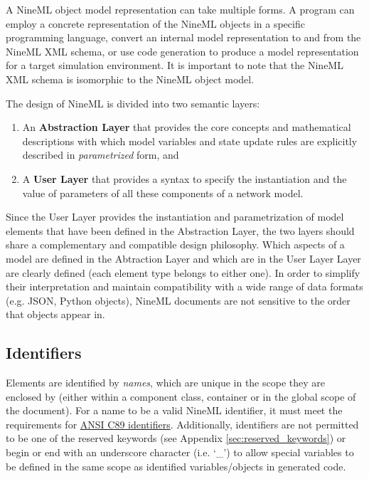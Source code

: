 \documentclass[draftspec]{ninemlspec}
\begin{document}
A NineML object model representation can take multiple forms.  A
program can employ a concrete representation of the NineML objects in
a specific programming language, convert an internal model
representation to and from the NineML XML schema, or use code generation 
to produce a model representation for a target simulation environment. 
It is important to note that the NineML XML schema is isomorphic to the NineML
object model.

The design of NineML is divided into two semantic layers:
\begin {enumerate}
\item An {\bf Abstraction Layer} that provides the core concepts and
mathematical descriptions with which model variables and state update
rules are explicitly described in {\em parametrized} form, and
\item A {\bf User Layer} that provides a syntax to specify the
instantiation and the value of parameters of all these components of a network
model.
\end {enumerate}

Since the User Layer provides the instantiation and
parametrization of model elements that have been defined in the
Abstraction Layer, the two layers should share
a complementary and compatible design philosophy. Which aspects of a model
are defined in the Abtraction Layer and which are in the User Layer
Layer are clearly defined (each element type belongs to either one).
In order to simplify their interpretation and maintain compatibility with a wide 
range of data formats (e.g. JSON, Python objects), NineML documents are 
not sensitive to the order that objects appear in.

\subsection{Identifiers}
\label{sec:identifier}

Elements are identified by \emph{names}, which are unique in the scope they are enclosed by (either within a component class, container or in the global scope of the document). For a name to be a valid NineML identifier, it must meet the requirements for \href{http://msdn.microsoft.com/en-us/library/e7f8y25b.aspx}{ANSI C89 identifiers}. Additionally, identifiers are not permitted to be one of the reserved keywords (see Appendix \ref{sec:reserved_keywords}) or begin or end with an underscore character (i.e. `\_') to allow special variables to be defined in the same scope as identified variables/objects in generated code.
\end{document}
